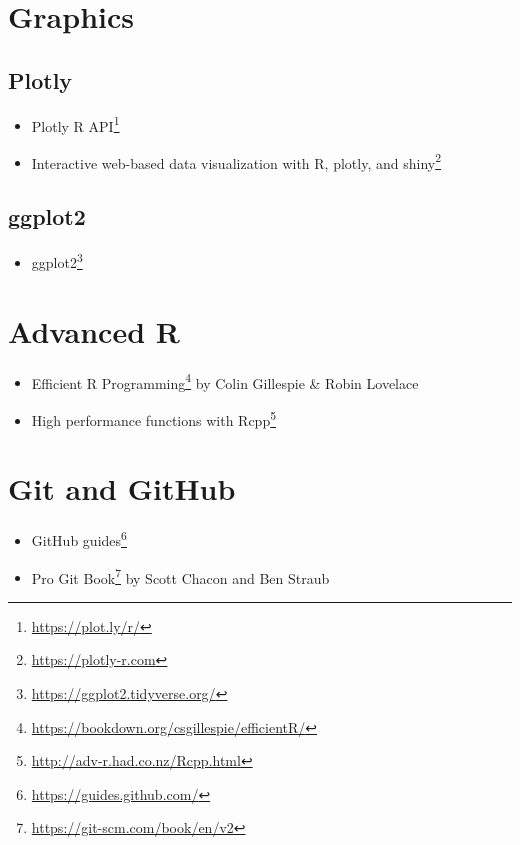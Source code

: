 \documentclass[
]{book}
\providecommand{\tightlist}{%
  \setlength{\itemsep}{0pt}\setlength{\parskip}{0pt}}
\renewcommand{\href}[2]{#2\footnote{\url{#1}}}
\begin{document}
\hypertarget{graphics-1}{%
\section{Graphics}\label{graphics-1}}

\hypertarget{plotly-2}{%
\subsection{Plotly}\label{plotly-2}}

\begin{itemize}
\tightlist
\item
  \href{https://plot.ly/r/}{Plotly R API}
\item
  \href{https://plotly-r.com}{Interactive web-based data visualization with R, plotly, and shiny}
\end{itemize}

\hypertarget{ggplot2-8}{%
\subsection{ggplot2}\label{ggplot2-8}}

\begin{itemize}
\tightlist
\item
  \href{https://ggplot2.tidyverse.org/}{ggplot2}
\end{itemize}

\hypertarget{advanced-r}{%
\section{Advanced R}\label{advanced-r}}

\begin{itemize}
\tightlist
\item
  \href{https://bookdown.org/csgillespie/efficientR/}{Efficient R Programming} by Colin Gillespie \& Robin Lovelace
\item
  \href{http://adv-r.had.co.nz/Rcpp.html}{High performance functions with Rcpp}
\end{itemize}

\hypertarget{git-and-github}{%
\section{Git and GitHub}\label{git-and-github}}

\begin{itemize}
\tightlist
\item
  \href{https://guides.github.com/}{GitHub guides}
\item
  \href{https://git-scm.com/book/en/v2}{Pro Git Book} by Scott Chacon and Ben Straub
\end{itemize}
\end{document}
